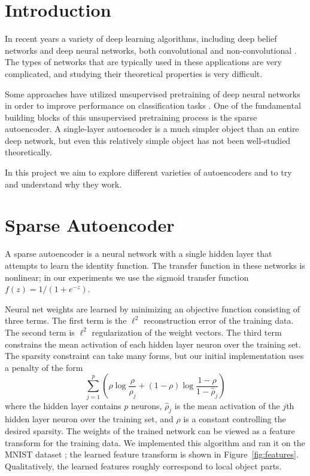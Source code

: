 \documentclass[twocolumn]{article}
\begin{document}
\section{Introduction}
In recent years a variety of deep learning algorithms, including deep belief networks
\cite{hinton2006fast,lee2009convolutional} and deep neural networks, both convolutional
\cite{krizhevsky2012imagenet} and non-convolutional \cite{le2011building}. The types of
networks that are typically used in these applications are very complicated, and studying
their theoretical properties is very difficult.

Some approaches have utilized unsupervised
pretraining of deep neural networks in order to improve performance on classification tasks
\cite{le2011building}. One of the fundamental building blocks of this unsupervised pretraining
process is the sparse autoencoder. A single-layer autoencoder is a much simpler object than
an entire deep network, but even this relatively simple object has not been well-studied
theoretically.

In this project we aim to explore different varieties of autoencoders and to try and understand
why they work.

\vspace{-0.5pc}
\section{Sparse Autoencoder}
A sparse autoencoder is a neural network with a single hidden layer that attempts to learn the
identity function. The transfer function in these networks is nonlinear; in our experiments we use
the sigmoid transfer function $f(z)=1/(1+e^{-z})$.

Neural net weights are learned by minimizing an objective function consisting
of three terms. The first term is the $\ell^2$ reconstruction error of the training data.
The second term is $\ell^2$ regularization of the weight vectors. The third term constrains the
mean activation of each hidden layer neuron over the training set. The sparsity constraint can take
many forms, but our initial implementation uses a penalty of the form 
\[\sum_{j=1}^p\left(\rho\log\frac{\rho}{\hat\rho_j}+(1-\rho)\log\frac{1-\rho}{1-\hat\rho_j}\right)\]
where the hidden layer contains $p$ neurons, $\hat\rho_j$ is the mean activation of the $j$th hidden
layer neuron over the training set, and $\rho$ is a constant controlling the desired sparsity.
The weights of the trained network can be viewed as a feature transform for the training data.
We implemented this algorithm and ran it on the MNIST dataset \cite{lecun1998mnist}; the learned
feature transform is shown in Figure~\ref{fig:features}. Qualitatively, the learned features
roughly correspond to local object parts.
\end{document}
